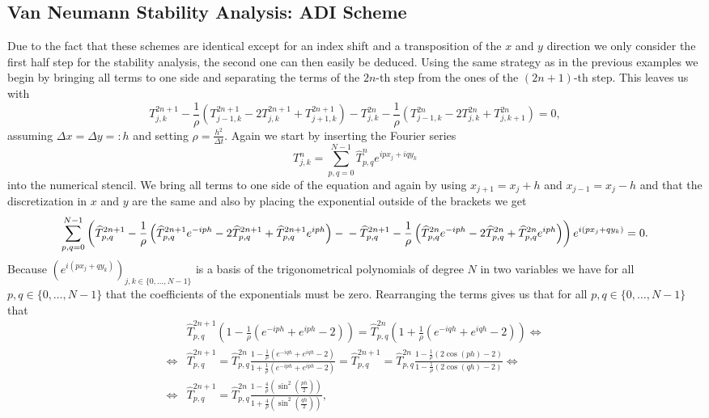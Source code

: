 \documentclass[a4aper,pagesize]{article}
\theoremstyle{definition}
\theoremstyle{plain}
\theoremstyle{remark}
\renewcommand{\hat}{\widehat}
\begin{document}
\subsection{Van Neumann Stability Analysis: ADI Scheme}
Due to the fact that these schemes are identical except for an index shift and a transposition of the $x$ and $y$ direction we only consider the first half step for the stability analysis, the second one can then easily be deduced. Using the same strategy as in the previous examples we begin by bringing all terms to one side and separating the terms of the $2n$-th step from the ones of the $(2n+1)$-th step. This leaves us with
\begin{equation}
	T_{j,k}^{2n+1}
	- \frac{1}{\rho}\left(
		T_{j-1,k}^{2n+1}
		-2T_{j,k}^{2n+1}
		+T_{j+1,k}^{2n+1}
	\right)
	-T_{j,k}^{2n}
	- \frac{1}{\rho}\left(
		T_{j-1,k}^{2n}
		-2T_{j,k}^{2n}
		+T_{j,k+1}^{2n}
	\right)
	=
	0,
\end{equation}
assuming $\Delta x = \Delta y =: h$ and setting $\rho = \frac{h^2}{\Delta t}$. Again we start by inserting the Fourier series
\begin{equation}
	T_{j,k}^n = \sum_{p,q = 0}^{N-1} \hat{T}^n_{p,q} e^{ipx_j + iqy_k}
\end{equation}
into the numerical stencil. We bring all terms to one side of the equation and again by using $x_{j+1} = {x_j} + h$ and $x_{j-1} = {x_j} - h$ and that the discretization in $x$ and $y$ are the same and also by placing the exponential outside of the brackets we get
\begin{dmath}
	\sum_{p,q = 0}^{N-1}\left(
		\hat{T}_{p,q}^{2n+1}
		-\frac{1}{\rho}\left(
			\hat{T}_{p,q}^{2n+1} e^{-iph}
			- 2 \hat{T}_{p,q}^{2n+1}
			+ \hat{T}_{p,q}^{2n+1} e^{iph}
		\right)
		-\\
		-\hat{T}_{p,q}^{2n+1}
		-\frac{1}{\rho}\left(
			\hat{T}_{p,q}^{2n} e^{-iph}
			- 2 \hat{T}_{p,q}^{2n}
			+ \hat{T}_{p,q}^{2n} e^{iph}
		\right)
	\right)
	e^{i(px_j + qy_k)}
	=
	0.
\end{dmath}
Because $(e^{i(px_{j} + qy_{k})})_{j,k \in \{0, ..., N-1\}}$ is a basis of the trigonometrical polynomials of degree $N$ in two variables we have for all $p,q \in \{0, \dots, N-1\}$ that the coefficients of the exponentials must be zero. Rearranging the terms gives us that for all $p,q \in \{0, \dots, N-1\}$ that
\begin{align}
	&\hat{T}_{p,q}^{2n+1}
	\left(
		1
		-\frac{1}{\rho}\left(
			e^{-iph}
			+ e^{iph}
			- 2
		\right)
	\right)
	=
	\hat{T}_{p,q}^{2n}
	\left(
		1
		+\frac{1}{\rho}\left(
			e^{-iqh}
			+ e^{iqh}
			- 2
		\right)
	\right)
\Leftrightarrow\\
\Leftrightarrow&
	\hat{T}_{p,q}^{2n+1}
	=
	\hat{T}_{p,q}^{2n}
	\frac{
		1
		-\frac{1}{\rho}\left(
			e^{-iqh}
			+ e^{iqh}
			- 2
		\right)
	}{
		1
		+\frac{1}{\rho}\left(
			e^{-iph}
			+ e^{iph}
			- 2
		\right)
	}
	=
	\hat{T}_{p,q}^{2n+1}
	=
	\hat{T}_{p,q}^{2n}
	\frac{
		1-\frac{1}{\rho}(2\cos(ph)- 2)
	}{
		1-\frac{1}{\rho}(2\cos(qh)- 2)
	}
\Leftrightarrow\\
\Leftrightarrow&
	\hat{T}_{p,q}^{2n+1}
	=
	\hat{T}_{p,q}^{2n}
	\frac{
		1-\frac{4}{\rho}\left(\sin^2\left(\frac{ph}{2}\right)\right)
	}{
		1+\frac{4}{\rho}\left(\sin^2\left(\frac{qh}{2}\right)\right)
	},
\end{align}
\end{document}
